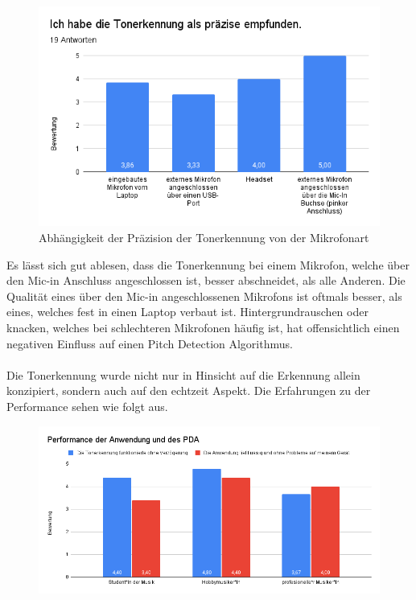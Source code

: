 \begin{figure}[H]
    \centering
    \includegraphics[width=1\textwidth]{Bilder/eval-tonerkennung-vergleichMikrofon.png}
    \caption{Abhängigkeit der Präzision der Tonerkennung von der Mikrofonart}
\end{figure}
Es lässt sich gut ablesen, dass die Tonerkennung bei einem Mikrofon, welche über den Mic-in Anschluss angeschlossen ist, besser abschneidet, als alle Anderen. Die Qualität eines über den Mic-in angeschlossenen Mikrofons ist oftmals besser, als eines, welches fest in einen Laptop verbaut ist. Hintergrundrauschen oder knacken, welches bei schlechteren Mikrofonen häufig ist, hat offensichtlich einen negativen Einfluss auf einen Pitch Detection Algorithmus. \\\\
Die Tonerkennung wurde nicht nur in Hinsicht auf die Erkennung allein konzipiert, sondern auch auf den echtzeit Aspekt. Die Erfahrungen zu der Performance sehen wie folgt aus.
\begin{figure}[H]
    \centering
    \includegraphics[width=1\textwidth]{Bilder/eval-verzoegerung-vergleich.png}
\end{figure} 

